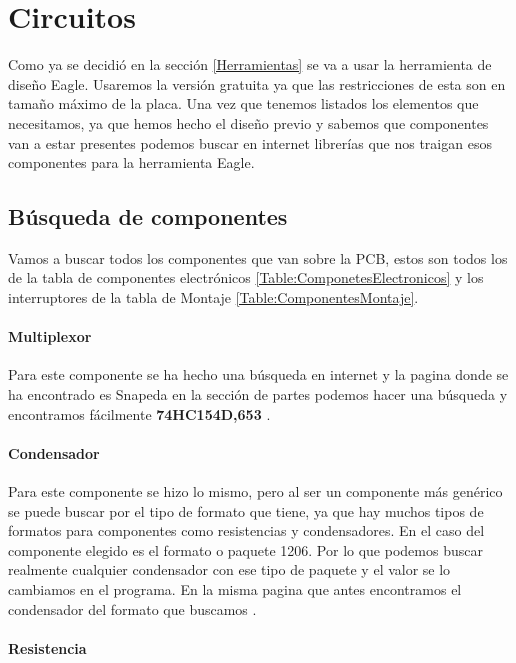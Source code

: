 \chapter{Circuitos}

Como ya se decidió en la sección \ref{Herramientas} se va a usar la herramienta de diseño Eagle.
Usaremos la versión gratuita ya que las restricciones de esta son en tamaño máximo de la placa. Una vez que tenemos listados los elementos que necesitamos, ya que hemos hecho el diseño previo y sabemos que componentes van a estar presentes podemos buscar en internet librerías que nos traigan esos componentes para la herramienta Eagle.

\section{Búsqueda de componentes}

Vamos a buscar todos los componentes que van sobre la \gls{PCB}, estos son todos los de la tabla de componentes electrónicos \ref{Table:ComponetesElectronicos} y los interruptores de la tabla de Montaje \ref{Table:ComponentesMontaje}.

\subsubsection{\gls{Multiplexor}}

Para este componente se ha hecho una búsqueda en internet y la pagina donde se ha encontrado es Snapeda \cite{Snapeda} en la sección de partes podemos hacer una búsqueda y encontramos fácilmente \textbf{74HC154D,653} \cite{SnapedaMux}.

\subsubsection{Condensador}

Para este componente se hizo lo mismo, pero al ser un componente más genérico se puede buscar por el tipo de formato que tiene, ya que hay muchos tipos de formatos para componentes como resistencias y condensadores. En el caso del componente elegido es el formato o paquete 1206. Por lo que podemos buscar realmente cualquier condensador con ese tipo de paquete y el valor se lo cambiamos en el programa. En la misma pagina que antes encontramos el condensador del formato que buscamos \cite{SnapedaCap}.

\subsubsection{Resistencia}

